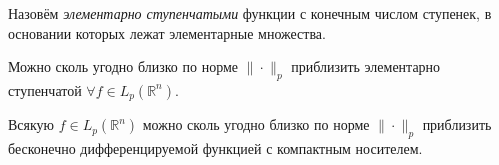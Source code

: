 
\begin{to_def}
    Назовём \textit{элементарно ступенчатыми} функции с конечным числом ступенек, в основании которых лежат элементарные множества.
\end{to_def}

\begin{to_thr}[]
     Можно сколь угодно близко по норме $\| \cdot \|_p$ приблизить элементарно ступенчатой $\forall f \in L_p(\mathbb{R}^n)$.
\end{to_thr}

\begin{to_thr}
    Всякую $f \in L_p (\mathbb{R}^n)$ можно сколь угодно близко по норме $\| \cdot \|_p$ приблизить бесконечно дифференцируемой функцией с компактным носителем.
\end{to_thr}


